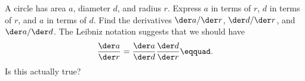 A circle has area $a$, diameter $d$, and radius $r$.
Express $a$ in terms of $r$,
$d$ in terms of $r$, and
$a$ in terms of $d$.
Find the derivatives $\der a/\der r$, $\der d/\der r$, and $\der a/\der d$.
The Leibniz notation suggests that we should have
\begin{equation*}
  \frac{\der a}{\der r} = \frac{\der a}{\der d}  \frac{\der d}{\der r}\eqquad.
\end{equation*}
Is this actually true?
